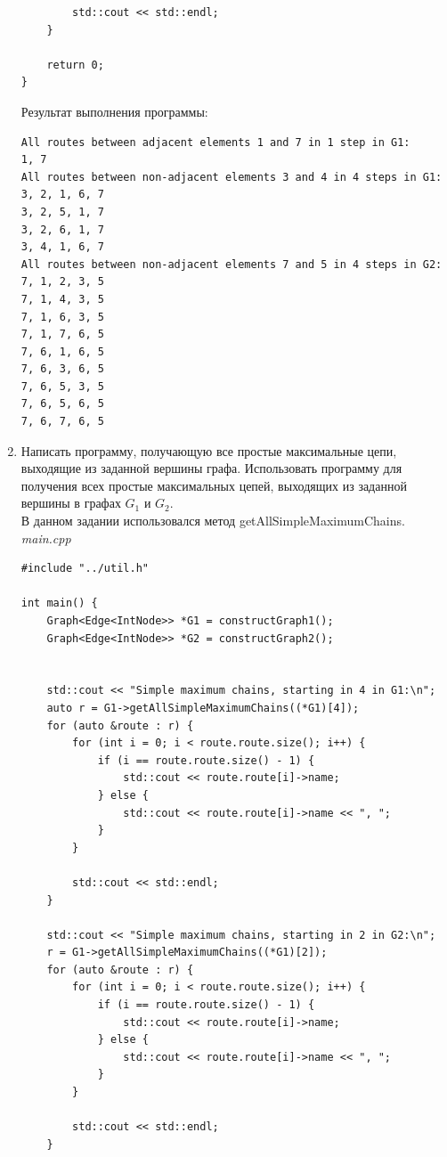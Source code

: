 \documentclass[a4paper,14pt]{extarticle}
\begin{document}
\begin{enumerate}[1.]
\begin{verbatim}
        std::cout << std::endl;
    }

    return 0;
}
        \end{verbatim}
        Результат выполнения программы:
        \begin{verbatim}
All routes between adjacent elements 1 and 7 in 1 step in G1: 
1, 7
All routes between non-adjacent elements 3 and 4 in 4 steps in G1: 
3, 2, 1, 6, 7
3, 2, 5, 1, 7
3, 2, 6, 1, 7
3, 4, 1, 6, 7
All routes between non-adjacent elements 7 and 5 in 4 steps in G2: 
7, 1, 2, 3, 5
7, 1, 4, 3, 5
7, 1, 6, 3, 5
7, 1, 7, 6, 5
7, 6, 1, 6, 5
7, 6, 3, 6, 5
7, 6, 5, 3, 5
7, 6, 5, 6, 5
7, 6, 7, 6, 5
        \end{verbatim}


        \item Написать программу, получающую все простые максимальные
        цепи, выходящие из заданной вершины графа. Использовать 
        программу для получения всех простые максимальных цепей, выходящих из
        заданной вершины в графах $G_1$ и $G_2$.\\
        В данном задании использовался метод getAllSimpleMaximumChains.\\
        \textit{main.cpp}
        \begin{verbatim}
#include "../util.h"

int main() {
    Graph<Edge<IntNode>> *G1 = constructGraph1();
    Graph<Edge<IntNode>> *G2 = constructGraph2();


    std::cout << "Simple maximum chains, starting in 4 in G1:\n"; 
    auto r = G1->getAllSimpleMaximumChains((*G1)[4]);
    for (auto &route : r) {
        for (int i = 0; i < route.route.size(); i++) {
            if (i == route.route.size() - 1) {
                std::cout << route.route[i]->name;
            } else {
                std::cout << route.route[i]->name << ", ";
            }
        }

        std::cout << std::endl;
    }

    std::cout << "Simple maximum chains, starting in 2 in G2:\n";
    r = G1->getAllSimpleMaximumChains((*G1)[2]);
    for (auto &route : r) {
        for (int i = 0; i < route.route.size(); i++) {
            if (i == route.route.size() - 1) {
                std::cout << route.route[i]->name;
            } else {
                std::cout << route.route[i]->name << ", ";
            }
        }

        std::cout << std::endl;
    }


\end{verbatim}
\end{enumerate}
\end{document}
